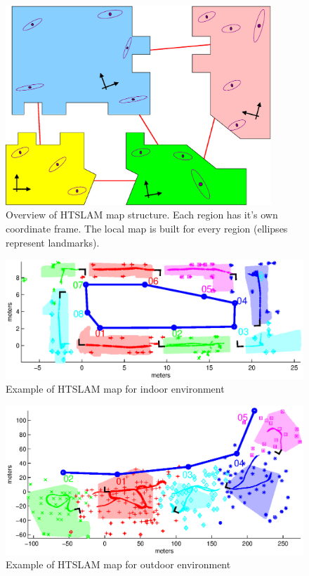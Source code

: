 \begin{figure}
\begin{center}
\includegraphics[width=10cm]{Pics/fig_map_structure}
\end{center}
\caption[Overview of HTSLAM map structure.]
{Overview of HTSLAM map structure. Each region has it's own
coordinate frame. The local map is built for every region (ellipses
represent landmarks). }
\label{fig:htslam_structure}
\end{figure}

\begin{figure}
\begin{center}
\includegraphics[width=14cm]{Pics/map_example_indoor}
\end{center}
\caption{Example of HTSLAM map for indoor environment}
\label{fig:htslam_structure_indoor}
\end{figure}


\begin{figure}
\includegraphics[width=14cm]{Pics/map_example_outdoor}
\caption{Example of HTSLAM map for outdoor environment}
\label{fig:htslam_structure_outdoor}
\end{figure}

